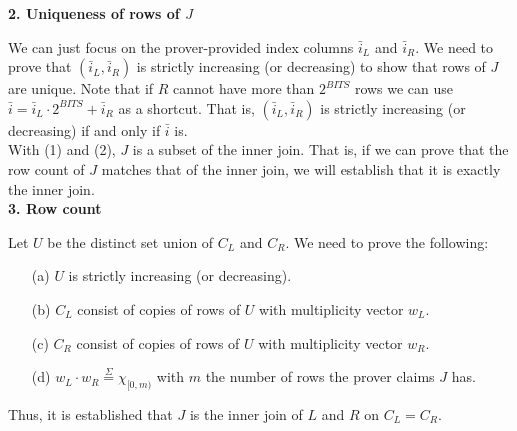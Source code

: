 \documentclass[11pt]{article}
\begin{document}
\textbf{2. Uniqueness of rows of $J$}

We can just focus on the prover-provided index columns $\bar{i}_L$ and $\bar{i}_R$. We need to prove that $(\bar{i}_L, \bar{i}_R)$ is strictly increasing (or decreasing) to show that rows of $J$ are unique. Note that if $R$ cannot have more than $2^{BITS}$ rows we can use $\bar{i} = \bar{i}_L \cdot 2^{BITS} + \bar{i}_R$ as a shortcut. That is, $(\bar{i}_L, \bar{i}_R)$ is strictly increasing (or decreasing) if and only if $\bar{i}$ is.\\
\noindent With (1) and (2), $J$ is a subset of the inner join. That is, if we can prove that the row count of $J$ matches that of the inner join, we will establish that it is exactly the inner join.\\

\textbf{3. Row count}

Let $U$ be the distinct set union of $C_L$ and $C_R$. We need to prove the following:\\
\begin{enumerate}
\item[(a)] $U$ is strictly increasing (or decreasing).
\item[(b)] $C_L$ consist of copies of rows of $U$ with multiplicity vector $w_L$.
\item[(c)] $C_R$ consist of copies of rows of $U$ with multiplicity vector $w_R$.
\item[(d)] $w_L \cdot w_R \overset{\Sigma}{=} \chi_{[0,m)}$ with $m$ the number of rows the prover claims $J$ has.
\end{enumerate}

Thus, it is established that $J$ is the inner join of $L$ and $R$ on $C_L = C_R$.\\
\end{document}
